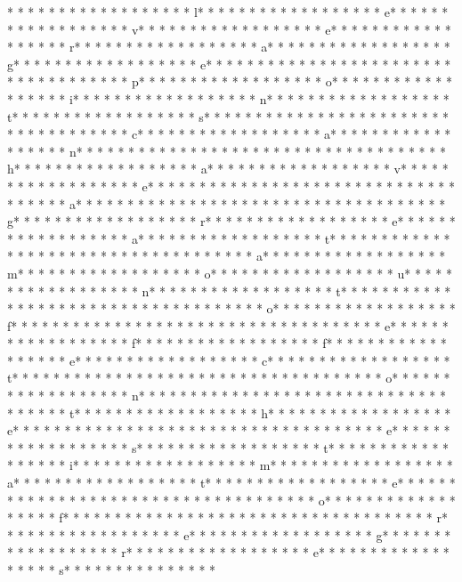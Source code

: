 * * *  * * *  * * *  *  * * *  *  * * *  * l* * *  * * *  * * *  *  * * *  *  * * *  * e* * *  * * *  * * *  *  * * *  *  * * *  * v* * *  * * *  * * *  *  * * *  *  * * *  * e* * *  * * *  * * *  *  * * *  *  * * *  * r* * *  * * *  * * *  *  * * *  *  * * *  * a* * *  * * *  * * *  *  * * *  *  * * *  * g* * *  * * *  * * *  *  * * *  *  * * *  * e* * *  * * *  * * *  *  * * *  *  * * *  *  * * *  * * *  * * *  *  * * *  *  * * *  * p* * *  * * *  * * *  *  * * *  *  * * *  * o* * *  * * *  * * *  *  * * *  *  * * *  * i* * *  * * *  * * *  *  * * *  *  * * *  * n* * *  * * *  * * *  *  * * *  *  * * *  * t* * *  * * *  * * *  *  * * *  *  * * *  * s* * *  * * *  * * *  *  * * *  *  * * *  *  * * *  * * *  * * *  *  * * *  *  * * *  * c* * *  * * *  * * *  *  * * *  *  * * *  * a* * *  * * *  * * *  *  * * *  *  * * *  * n* * *  * * *  * * *  *  * * *  *  * * *  *  * * *  * * *  * * *  *  * * *  *  * * *  * h* * *  * * *  * * *  *  * * *  *  * * *  * a* * *  * * *  * * *  *  * * *  *  * * *  * v* * *  * * *  * * *  *  * * *  *  * * *  * e* * *  * * *  * * *  *  * * *  *  * * *  *  * * *  * * *  * * *  *  * * *  *  * * *  * a* * *  * * *  * * *  *  * * *  *  * * *  *  * * *  * * *  * * *  *  * * *  *  * * *  * g* * *  * * *  * * *  *  * * *  *  * * *  * r* * *  * * *  * * *  *  * * *  *  * * *  * e* * *  * * *  * * *  *  * * *  *  * * *  * a* * *  * * *  * * *  *  * * *  *  * * *  * t* * *  * * *  * * *  *  * * *  *  * * *  *  * * *  * * *  * * *  *  * * *  *  * * *  * a* * *  * * *  * * *  *  * * *  *  * * *  * m* * *  * * *  * * *  *  * * *  *  * * *  * o* * *  * * *  * * *  *  * * *  *  * * *  * u* * *  * * *  * * *  *  * * *  *  * * *  * n* * *  * * *  * * *  *  * * *  *  * * *  * t* * *  * * *  * * *  *  * * *  *  * * *  *  * * *  * * *  * * *  *  * * *  *  * * *  * o* * *  * * *  * * *  *  * * *  *  * * *  * f* * *  * * *  * * *  *  * * *  *  * * *  *  * * *  * * *  * * *  *  * * *  *  * * *  * e* * *  * * *  * * *  *  * * *  *  * * *  * f* * *  * * *  * * *  *  * * *  *  * * *  * f* * *  * * *  * * *  *  * * *  *  * * *  * e* * *  * * *  * * *  *  * * *  *  * * *  * c* * *  * * *  * * *  *  * * *  *  * * *  * t* * *  * * *  * * *  *  * * *  *  * * *  *  * * *  * * *  * * *  *  * * *  *  * * *  * o* * *  * * *  * * *  *  * * *  *  * * *  * n* * *  * * *  * * *  *  * * *  *  * * *  *  * * *  * * *  * * *  *  * * *  *  * * *  * t* * *  * * *  * * *  *  * * *  *  * * *  * h* * *  * * *  * * *  *  * * *  *  * * *  * e* * *  * * *  * * *  *  * * *  *  * * *  *  * * *  * * *  * * *  *  * * *  *  * * *  * e* * *  * * *  * * *  *  * * *  *  * * *  * s* * *  * * *  * * *  *  * * *  *  * * *  * t* * *  * * *  * * *  *  * * *  *  * * *  * i* * *  * * *  * * *  *  * * *  *  * * *  * m* * *  * * *  * * *  *  * * *  *  * * *  * a* * *  * * *  * * *  *  * * *  *  * * *  * t* * *  * * *  * * *  *  * * *  *  * * *  * e* * *  * * *  * * *  *  * * *  *  * * *  *  * * *  * * *  * * *  *  * * *  *  * * *  * o* * *  * * *  * * *  *  * * *  *  * * *  * f* * *  * * *  * * *  *  * * *  *  * * *  *  * * *  * * *  * * *  *  * * *  *  * * *  * r* * *  * * *  * * *  *  * * *  *  * * *  * e* * *  * * *  * * *  *  * * *  *  * * *  * g* * *  * * *  * * *  *  * * *  *  * * *  * r* * *  * * *  * * *  *  * * *  *  * * *  * e* * *  * * *  * * *  *  * * *  *  * * *  * s* * *  * * *  * * *  *  * * *  *  * 
